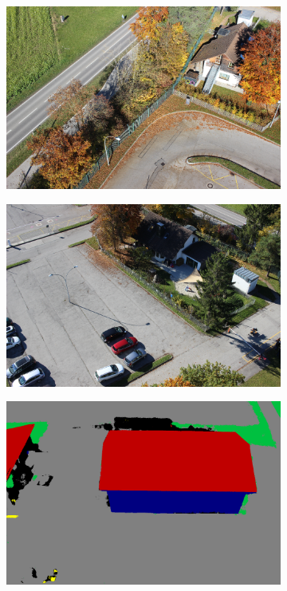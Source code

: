 \begin{figure}[H]
\begin{subfigure}[tbp]{0.24\columnwidth}
           \includegraphics[width=\textwidth]{segment/kiga_ori1.png}
           \caption[]{}
           {{\small }}
           \label{fig:4c}
       \end{subfigure}       
       \begin{subfigure}[tbp]{0.24\columnwidth}
           \centering
           \includegraphics[width=\textwidth]{segment/kiga_ori2.png}
           \caption[]{}%
           {{\small }}
           \label{fig:4d}
       \end{subfigure}
       \hfill       
       \begin{subfigure}[tbp]{0.24\columnwidth}  
           \centering 
           \includegraphics[width=\textwidth]{segment/fin_seg1.png}

\end{subfigure}
\end{figure}
